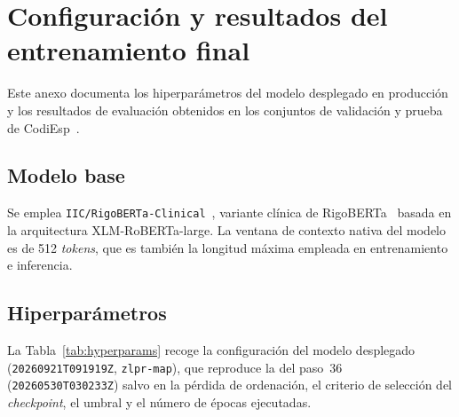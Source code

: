 \chapter{Configuración y resultados del entrenamiento final}
\label{cap:AnexoH}

Este anexo documenta los hiperparámetros del modelo desplegado en producción y los resultados de evaluación obtenidos en los conjuntos de validación y prueba de CodiEsp~\cite{miranda2020}.

\section{Modelo base}

Se emplea \texttt{IIC/RigoBERTa-Clinical}~\cite{garciasubies2026rigobertaclinical}, variante clínica de RigoBERTa~\cite{vacaserrano2022rigoberta} basada en la arquitectura XLM-RoBERTa-large. La ventana de contexto nativa del modelo es de 512 \emph{tokens}, que es también la longitud máxima empleada en entrenamiento e inferencia.

\section{Hiperparámetros}

La Tabla~\ref{tab:hyperparams} recoge la configuración del modelo desplegado (\texttt{20260921T091919Z}, \texttt{zlpr-map}), que reproduce la del paso~36 (\texttt{20260530T030233Z}) salvo en la pérdida de ordenación, el criterio de selección del \emph{checkpoint}, el umbral y el número de épocas ejecutadas.

